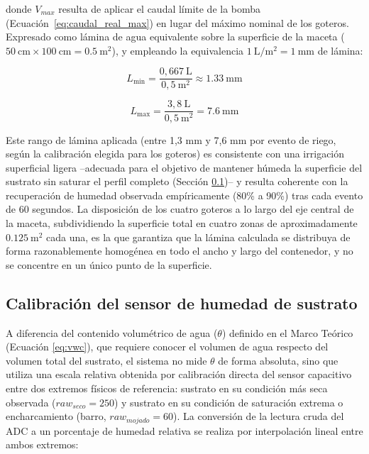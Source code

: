 \noindent donde $V_{max}$ resulta de aplicar el caudal límite de la bomba (Ecuación~\ref{eq:caudal_real_max}) en lugar del máximo nominal de los goteros. Expresado como lámina de agua equivalente sobre la superficie de la maceta ($\SI{50}{\centi\meter} \times \SI{100}{\centi\meter} = \SI{0.5}{\meter\squared}$), y empleando la equivalencia $\SI{1}{\liter\per\meter\squared} = \SI{1}{\milli\meter}$ de lámina:

\begin{equation}
\label{eq:Lamina_riego_min}
L_{\text{min}} = \frac{0{,}667\ \text{L}}{0{,}5\ \text{m}^2}
\approx \SI{1.33}{\milli\meter}
\end{equation}

\begin{equation}
\label{eq:Lamina_riego_max}
L_{\text{max}} = \frac{3{,}8\ \text{L}}{0{,}5\ \text{m}^2}
= \SI{7.6}{\milli\meter}
\end{equation}

Este rango de lámina aplicada (entre 1,3 mm y 7,6 mm por evento de riego, según la calibración elegida para los goteros) es consistente con una irrigación superficial ligera --adecuada para el objetivo de mantener húmeda la superficie del sustrato sin saturar el perfil completo (Sección \ref{subsec:calibracion_higrometro})-- y resulta coherente con la recuperación de humedad observada empíricamente (80\% a 90\%) tras cada evento de 60 segundos. La disposición de los cuatro goteros a lo largo del eje central de la maceta, subdividiendo la superficie total en cuatro zonas de aproximadamente $\SI{0.125}{\meter\squared}$ cada una, es la que garantiza que la lámina calculada se distribuya de forma razonablemente homogénea en todo el ancho y largo del contenedor, y no se concentre en un único punto de la superficie.

\subsection{Calibración del sensor de humedad de sustrato}
\label{subsec:calibracion_higrometro}

A diferencia del contenido volumétrico de agua ($\theta$) definido en el Marco Teórico (Ecuación \ref{eq:vwc}), que requiere conocer el volumen de agua respecto del volumen total del sustrato, el sistema no mide $\theta$ de forma absoluta, sino que utiliza una escala relativa obtenida por calibración directa del sensor capacitivo entre dos extremos físicos de referencia: sustrato en su condición más seca observada ($raw_{seco} = 250$) y sustrato en su condición de saturación extrema o encharcamiento (barro, $raw_{mojado} = 60$). La conversión de la lectura cruda del ADC a un porcentaje de humedad relativa se realiza por interpolación lineal entre ambos extremos:

